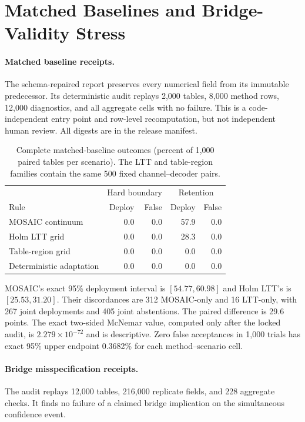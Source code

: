 \section{Matched Baselines and Bridge-Validity Stress}

\paragraph{Matched baseline receipts.}
The schema-repaired report preserves every numerical field from its immutable
predecessor. Its deterministic audit replays 2,000
tables, 8,000 method rows, 12,000 diagnostics, and all aggregate cells with no
failure. This is a code-independent entry point and row-level recomputation,
but not independent human review. All digests are in the release manifest.

\begin{table}[t]
\centering
\small
\setlength{\tabcolsep}{3.0pt}
\begin{tabular}{lrrrr}
\hline
& \multicolumn{2}{c}{Hard boundary} & \multicolumn{2}{c}{Retention} \\
Rule & Deploy & False & Deploy & False \\
\hline
MOSAIC continuum & 0.0 & 0.0 & 57.9 & 0.0 \\
Holm LTT grid & 0.0 & 0.0 & 28.3 & 0.0 \\
Table-region grid & 0.0 & 0.0 & 0.0 & 0.0 \\
Deterministic adaptation & 0.0 & 0.0 & 0.0 & 0.0 \\
\hline
\end{tabular}
\caption{Complete matched-baseline outcomes (percent of 1,000 paired tables
per scenario). The LTT and table-region families contain the same 500 fixed
channel--decoder pairs.}
\label{supp:tab:matched-baselines}
\end{table}

MOSAIC's exact 95\% deployment interval is $[54.77,60.98]$ and Holm LTT's is
$[25.53,31.20]$. Their discordances are 312 MOSAIC-only and 16 LTT-only, with
267 joint deployments and 405 joint abstentions. The paired difference is
29.6 points. The exact two-sided McNemar value, computed only after the locked
audit, is $2.279\times10^{-72}$ and is descriptive. Zero false acceptances in
1,000 trials has exact 95\% upper endpoint 0.3682\% for each method--scenario
cell.

\paragraph{Bridge misspecification receipts.}
The audit replays 12,000 tables,
216,000 replicate fields, and 228 aggregate checks. It finds no failure of a
claimed bridge implication on the simultaneous confidence event.

